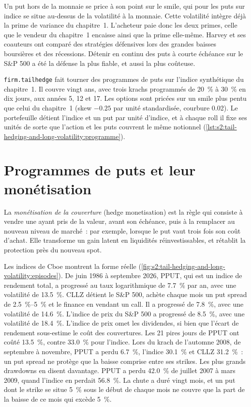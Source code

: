 Un put hors de la monnaie se price à son point sur le smile, qui pour les puts sur indice se situe au-dessus de la volatilité à la monnaie. Cette volatilité intègre déjà la prime
de variance du chapitre~1. L'acheteur paie donc les deux primes, celle que le vendeur du chapitre~1 encaisse ainsi que la prime elle-même. Harvey et ses coauteurs ont comparé des stratégies défensives lors des
grandes baisses boursières et des récessions. Détenir en continu des puts à courte échéance sur le S\&P 500 a été la défense la plus fiable, et aussi la plus coûteuse.

\texttt{firm.tailhedge} fait tourner des programmes de puts sur l'indice synthétique du chapitre~1. Il couvre vingt ans, avec trois krachs programmés de 20~\% à 30~\%
en dix jours, aux années 5, 12 et 17. Les options sont pricées sur un smile plus pentu que celui du chapitre~1 (skew $-0.25$ par unité standardisée, courbure 0.02). Le
portefeuille détient l'indice et un put par unité d'indice, et à chaque roll il fixe ses unités de sorte que l'action et les puts couvrent le même notionnel
(\cref{lst:s2:tail-hedging-and-long-volatility:programme}).

\section{Programmes de puts et leur monétisation}

\begin{definition}\label{def:s2:tail-hedging-and-long-volatility:monetisation}
La \emph{monétisation de la couverture} (hedge monetisation) est la règle qui consiste à vendre une  ayant pris de la valeur, avant son échéance, puis à la remplacer au
nouveau niveau de marché~: par exemple, lorsque le put vaut trois fois son coût d'achat. Elle transforme un gain latent en liquidités réinvestissables, et
rétablit la protection près du nouveau spot.
\end{definition}

Les indices de Cboe montrent la forme réelle (\cref{fig:s2:tail-hedging-and-long-volatility:episodes}). De juin 1986 à septembre 2026, PPUT, qui est un
indice de rendement total, a progressé au taux logarithmique de 7.7~\% par an, avec une volatilité de 13.5~\%. CLLZ détient le S\&P 500, achète chaque mois un put spread de 2.5~\%--5~\%
et le finance en vendant un call. Il a progressé de 7.8~\%, avec une volatilité de 14.6~\%. L'indice de prix du S\&P 500 a progressé de 8.5~\%, avec une volatilité de 18.4~\%.
L'indice de prix omet les dividendes, si bien que l'écart de rendement sous-estime le coût des couvertures. Les 21 pires jours de PPUT ont coûté 13.5~\%, contre 33.0~\% pour l'indice. Lors du
krach de l'automne 2008, de septembre à novembre, PPUT a perdu 6.7~\%, l'indice 30.1~\% et CLLZ 31.2~\%~: un put spread ne protège que la baisse comprise entre ses
strikes. Les plus grands drawdowns en disent davantage. PPUT a perdu 42.0~\% de juillet 2007 à mars 2009, quand l'indice en perdait 56.8~\%. La chute a duré vingt
mois, et un put dont le strike se situe 5~\% sous le début de chaque mois ne couvre que la part de la baisse de ce mois qui excède 5~\%.

